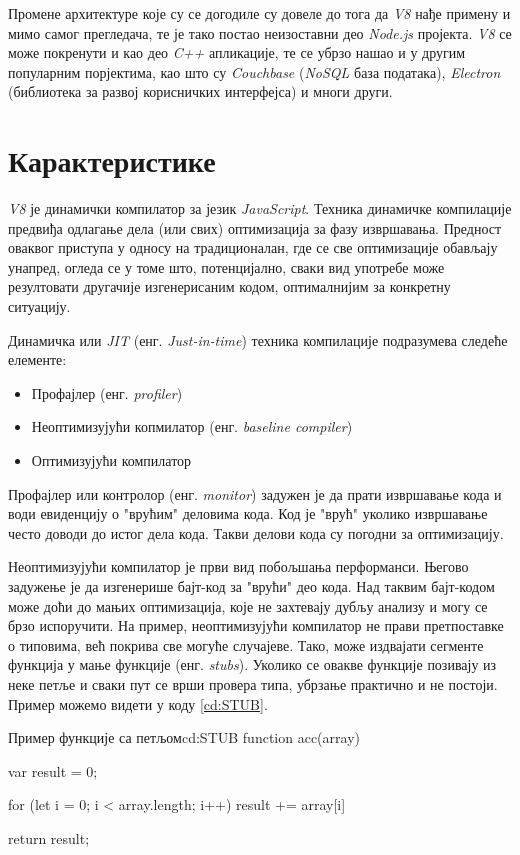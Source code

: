 \documentclass[12pt,oneside]{memoir}
\begin{document}
Промене архитектуре које су се догодиле су довеле до тога да \textit{V8} нађе примену и мимо самог прегледача, те је тако постао неизоставни део \textit{Node.js} пројекта.
\textit{V8} се може покренути и као део \textit{C++} апликације, те се убрзо нашао и у другим популарним порјектима, као што су \textit{Couchbase} (\textit{NoSQL} база података),
\textit{Electron} (библиотека за развој корисничких интерфејса) и многи други.

\section{Карактеристике} \label{chp:CHAR}

\textit{V8} је динамички компилатор за језик \textit{JavaScript}. Техника динамичке компилације предвиђа одлагање дела (или свих) оптимизација за фазу извршавања.
Предност оваквог приступа у односу на традиционалан, где се све оптимизације обављају унапред, огледа се у томе што, потенцијално, сваки вид употребе може резултовати
другачије изгенерисаним кодом, оптималнијим за конкретну ситуацију.

Динамичка или \textit{JIT} (енг. \textit{Just-in-time}) техника компилације подразумева следеће елементе:

\begin{itemize}
	\item Профајлер (енг. \textit{profiler})
	\item Неоптимизујући копмилатор (енг. \textit{baseline compiler})
	\item Оптимизујући компилатор
\end{itemize}

Профајлер или контролор (енг. \textit{monitor}) задужен је да прати извршавање кода и води евиденцију о "врућим" деловима кода. Код је "врућ" уколико извршавање
често доводи до истог дела кода. Такви делови кода су погодни за оптимизацију.

Неоптимизујући компилатор је први вид побољшања перформанси. Његово задужење је да изгенерише бајт-код за "врући" део кода. Над таквим бајт-кодом може доћи до мањих оптимизација,
које не захтевају дубљу анализу и могу се брзо испоручити. На пример, неоптимизујући компилатор не прави претпоставке о типовима, већ покрива све могуће случајеве. Тако,
може издвајати сегменте функција у мање функције (енг. \textit{stubs}). Уколико се овакве функције позивају из неке петље и сваки пут се врши провера типа, убрзање
практично и не постоји. Пример можемо видети у коду \ref{cd:STUB}.
\begin{code}{Пример функције са петљом}{cd:STUB}
	function acc(array) {
		var result = 0;

		for (let i = 0; i < array.length; i++) {
			result += array[i]
		}

		return result;
	}
\end{code}
\end{document}
